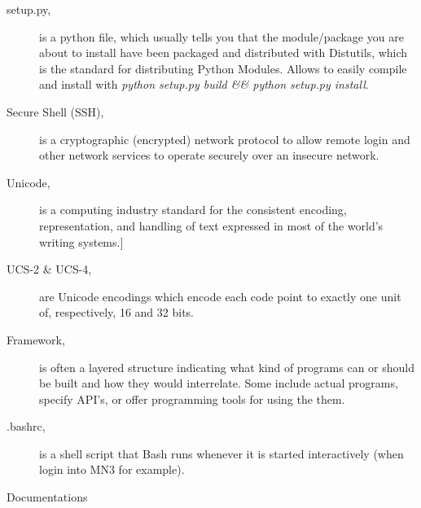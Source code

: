\begin{description}
\item [setup.py,] is a python file, which usually tells you that the module/package you are about to install have been packaged and distributed with Distutils, which is the standard for distributing Python Modules. Allows to easily compile and install with \textit{python setup.py build \&\& python setup.py install}.
\item [Secure Shell (SSH),]  is a cryptographic (encrypted) network protocol to allow remote login and other network services to operate securely over an insecure network. 
\item [Unicode,] is a computing industry standard for the consistent encoding, representation, and handling of text expressed in most of the world's writing systems.]
\item [UCS-2 \& UCS-4, ] are Unicode encodings which encode each code point to exactly one unit of, respectively, 16 and 32 bits. 




\item[Framework,] is often a layered structure indicating what kind of programs can or should be built and how they would interrelate. Some include actual programs, specify API's, or offer programming tools for using the them.

\item [.bashrc,] is a shell script that Bash runs whenever it is started interactively (when login into MN3 for example).
\end{description}



Documentations

\label{sec:docs}

